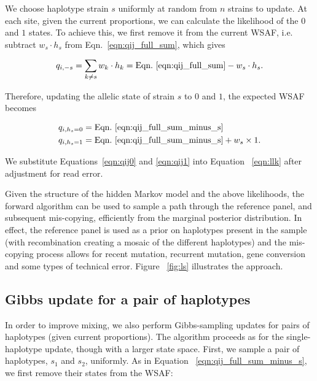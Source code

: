 \documentclass{nature}
\begin{document}
We choose haplotype strain $s$ uniformly at random from $n$ strains to update.  At each site, given the current proportions, we can calculate the likelihood of the $0$ and $1$ states.  To achieve this, we first remove it from the current WSAF, i.e. subtract $ w_s \cdot h_s$ from Eqn.~\eqref{eqn:qij_full_sum}, which gives

\begin{equation}
q_{i,-s} = \sum_{k\neq s} w_k \cdot h_k = \textrm{Eqn.~\eqref{eqn:qij_full_sum}} -  w_s \cdot h_s. \label{eqn:qij_full_sum_minus_s}
\end{equation}

\noindent Therefore, updating the allelic state of strain $s$ to $0$ and $1$, the expected WSAF becomes

\begin{align}
q_{i,h_s=0} & = \textrm{Eqn.~\eqref{eqn:qij_full_sum_minus_s}} \label{eqn:qij0}\\
q_{i,h_s=1} & = \textrm{Eqn.~\eqref{eqn:qij_full_sum_minus_s}} + w_s \times 1. \label{eqn:qij1}
\end{align}

\noindent We substitute Equations~\eqref{eqn:qij0} and \eqref{eqn:qij1} into Equation ~\eqref{eqn:llk} after adjustment for read error.

Given the structure of the hidden Markov model and the above likelihoods, the forward algorithm can be used to sample a path through the reference panel, and subsequent mis-copying, efficiently from the marginal posterior distribution.  In effect, the reference panel is used as a prior on haplotypes present in the sample (with recombination creating a mosaic of the different haplotypes) and the mis-copying process allows for recent mutation, recurrent mutation, gene conversion and some types of technical error.  Figure ~\ref{fig:ls} illustrates the approach.



\subsection*{Gibbs update for a pair of haplotypes}\label{sec:deconvolute}

In order to improve mixing, we also perform Gibbs-sampling updates for pairs of haplotypes (given current proportions). The algorithm proceeds as for the single-haplotype update, though with a larger state space.  First, we sample a pair of haplotypes, $s_1$ and $s_2$, uniformly. As in Equation ~\eqref{eqn:qij_full_sum_minus_s}, we first remove their states from the WSAF:
\end{document}
